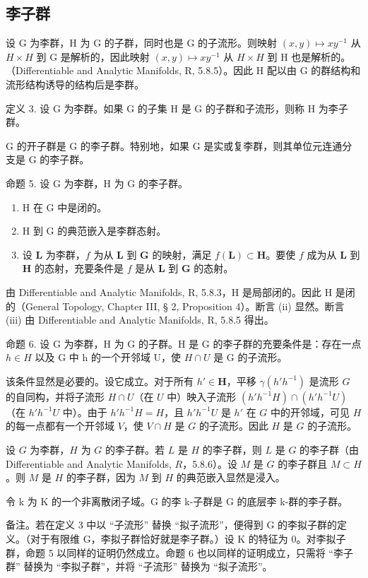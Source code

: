 \subsection{李子群}

设 G 为李群，H 为 G 的子群，同时也是 G 的子流形。则映射 \((x,y)\mapsto xy^{-1}\) 从 \(H\times H\) 到 G 是解析的，因此映射 \((x,y)\mapsto xy^{-1}\) 从 \(H\times H\) 到 H 也是解析的。（Differentiable and Analytic Manifolds, R, 5.8.5）。因此 H 配以由 G 的群结构和流形结构诱导的结构后是李群。

定义 3. 设 G 为李群。如果 G 的子集 H 是 G 的子群和子流形，则称 H 为李子群。

G 的开子群是 G 的李子群。特别地，如果 G 是实或复李群，则其单位元连通分支是 G 的李子群。

命题 5. 设 G 为李群，H 为 G 的李子群。

\begin{enumerate}
\def\labelenumi{(\roman{enumi})}
\item
  H 在 G 中是闭的。
\item
  H 到 G 的典范嵌入是李群态射。
\item
  设 \(\mathbf{L}\) 为李群，\(f\) 为从 \(\mathbf{L}\) 到 \(\mathbf{G}\) 的映射，满足 \(f(\mathbf{L}) \subset \mathbf{H}\)。要使 \(f\) 成为从 \(\mathbf{L}\) 到 \(\mathbf{H}\) 的态射，充要条件是 \(f\) 是从 \(\mathbf{L}\) 到 \(\mathbf{G}\) 的态射。
\end{enumerate}

由 Differentiable and Analytic Manifolds, R, 5.8.3，H 是局部闭的。因此 H 是闭的（General Topology, Chapter III, § 2, Proposition 4）。断言 (ii) 显然。断言 (iii) 由 Differentiable and Analytic Manifolds, R, 5.8.5 得出。

命题 6. 设 G 为李群，H 为 G 的子群。H 是 G 的李子群的充要条件是：存在一点 \(h \in H\) 以及 G 中 h 的一个开邻域 U，使 \(H \cap U\) 是 G 的子流形。

该条件显然是必要的。设它成立。对于所有 \(h' \in \mathbf{H}\)，平移 \(\gamma (h'h^{-1})\) 是流形 \(G\) 的自同构，并将子流形 \(H \cap U\)（在 \(U\) 中）映入子流形 \((h'h^{-1}H) \cap (h'h^{-1}U)\)（在 \(h'h^{-1}U\) 中）。由于 \(h'h^{-1}H = H\)，且 \(h'h^{-1}U\) 是 \(h'\) 在 \(G\) 中的开邻域，可见 \(H\) 的每一点都有一个开邻域 \(V\)，使 \(V \cap H\) 是 \(G\) 的子流形。因此 \(H\) 是 \(G\) 的子流形。

设 \(G\) 为李群，\(H\) 为 \(G\) 的李子群。若 \(L\) 是 \(H\) 的李子群，则 \(L\) 是 \(G\) 的李子群（由 Differentiable and Analytic Manifolds, \(R\)，5.8.6）。设 \(M\) 是 \(G\) 的李子群且 \(M \subset H\)。则 \(M\) 是 \(H\) 的李子群，因为 \(M\) 到 \(H\) 的典范嵌入显然是浸入。

令 k 为 K 的一个非离散闭子域。G 的李 k-子群是 G 的底层李 k-群的李子群。

备注。若在定义 3 中以 ``子流形'' 替换 ``拟子流形''，便得到 G 的李拟子群的定义。（对于有限维 G，李拟子群恰好就是李子群。）设 K 的特征为 0。对李拟子群，命题 5 以同样的证明仍然成立。命题 6 也以同样的证明成立，只需将 ``李子群'' 替换为 ``李拟子群''，并将 ``子流形'' 替换为 ``拟子流形''。

